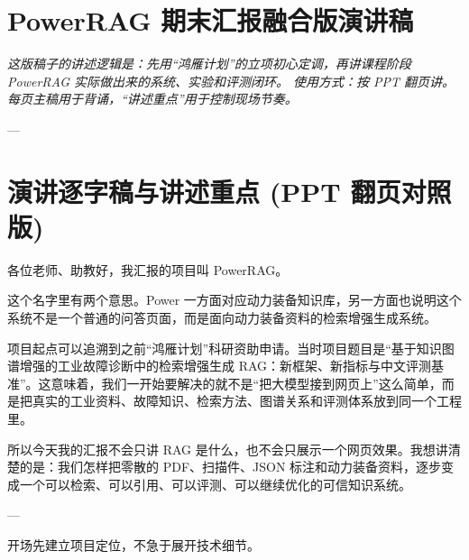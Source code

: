 \documentclass[10pt, a4paper]{ctexart}
\begin{document}
\setlength{\parskip}{1.5pt}

\section*{PowerRAG 期末汇报融合版演讲稿}


\begin{tcolorbox}[colback=blue!5, colframe=blue!40, arc=1.0mm, left=1.5mm, right=1.5mm, top=1mm, bottom=1mm, boxrule=0.4pt, beforeafter skip=2pt]
\itshape 这版稿子的讲述逻辑是：先用“鸿雁计划”的立项初心定调，再讲课程阶段 PowerRAG 实际做出来的系统、实验和评测闭环。 使用方式：按 PPT 翻页讲。每页主稿用于背诵，“讲述重点”用于控制现场节奏。
\end{tcolorbox}

---

\section*{演讲逐字稿与讲述重点 (PPT 翻页对照版)}

\begin{tcolorbox}[colback=white, colframe=primary!35, title={\textbf{第 1 页：PowerRAG}}, beforeafter skip=2.0pt]
\begin{minipage}[t]{0.72\textwidth}
  \linespread{1.0}\selectfont\footnotesize
  各位老师、助教好，我汇报的项目叫 PowerRAG。

这个名字里有两个意思。Power 一方面对应动力装备知识库，另一方面也说明这个系统不是一个普通的问答页面，而是面向动力装备资料的检索增强生成系统。

项目起点可以追溯到之前“鸿雁计划”科研资助申请。当时项目题目是“基于知识图谱增强的工业故障诊断中的检索增强生成 RAG：新框架、新指标与中文评测基准”。这意味着，我们一开始要解决的就不是“把大模型接到网页上”这么简单，而是把真实的工业资料、故障知识、检索方法、图谱关系和评测体系放到同一个工程里。

所以今天我的汇报不会只讲 RAG 是什么，也不会只展示一个网页效果。我想讲清楚的是：我们怎样把零散的 PDF、扫描件、JSON 标注和动力装备资料，逐步变成一个可以检索、可以引用、可以评测、可以继续优化的可信知识系统。

---
\end{minipage}
\hfill
\begin{minipage}[t]{0.25\textwidth}
  \fontsize{7.5}{9.5}\selectfont
  \begin{tcolorbox}[colback=orange!5, colframe=orange!45, title=\textbf{讲述重点}, left=0.6mm, right=0.6mm, top=0.8mm, bottom=0.8mm, arc=0.8mm, boxrule=0.4pt, beforeafter skip=0pt]
    开场先建立项目定位，不急于展开技术细节。
  \end{tcolorbox}
\end{minipage}
\end{tcolorbox}
\end{document}

